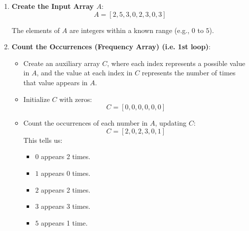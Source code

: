 \begin{example}
    \begin{enumerate}
        \item \textbf{Create the Input Array \( A \)}:
            \[
            A = [2, 5, 3, 0, 2, 3, 0, 3]
            \]
        
        The elements of \( A \) are integers within a known range (e.g., \( 0 \) to \( 5 \)).

        
        \item \textbf{Count the Occurrences (Frequency Array) (i.e. 1st loop)}:
        \begin{itemize}
            \item Create an auxiliary array \( C \), where each index represents a possible value in \( A \), and the value at each index in \( C \) represents the number of times that value appears in \( A \).
            \item Initialize \( C \) with zeros:
            \[
            C = [0, 0, 0, 0, 0, 0]
            \]
            \item Count the occurrences of each number in \( A \), updating \( C \):
            \[
            C = [2, 0, 2, 3, 0, 1]
            \]
            This tells us:
            \begin{itemize}
                \item \( 0 \) appears 2 times.
                \item \( 1 \) appears 0 times.
                \item \( 2 \) appears 2 times.
                \item \( 3 \) appears 3 times.
                \item \( 5 \) appears 1 time.
            \end{itemize}
        \end{itemize}
        

\end{enumerate}
\end{example}
